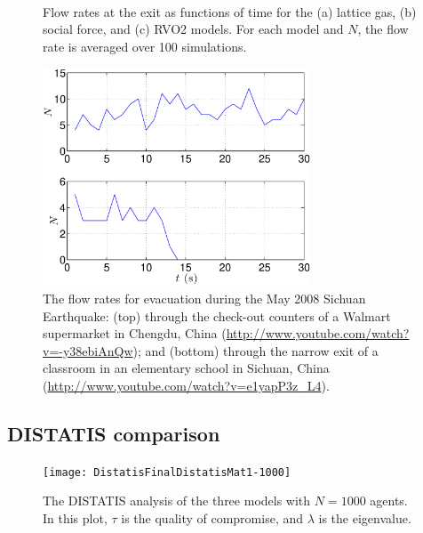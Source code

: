 \begin{figure}[htbp]
\centering
{}
\hspace{1cm}
\\
\caption{Flow rates at the exit as functions of time for the (a) lattice gas, (b) social force, and (c) RVO2 models. For each model and $N$, the flow rate is averaged over 100 simulations.}
\label{fig:FlowRate}
\end{figure}

\begin{figure}[htbp]
\centering
\includegraphics[width=8cm]{figures/Flowrate}
\caption{The flow rates for evacuation during the May 2008 Sichuan Earthquake: (top) through the check-out counters of a Walmart supermarket in Chengdu, China (\url{http://www.youtube.com/watch?v=-y38ebiAnQw}); and (bottom) through the narrow exit of a classroom in an elementary school in Sichuan, China (\url{http://www.youtube.com/watch?v=e1yapP3z_L4}).}
\centering
\label{fig:RealData}
\end{figure}


\subsection{DISTATIS comparison}

\begin{figure}[htbp]
\centering
\texttt{[image: DistatisFinalDistatisMat1-1000]}
\caption{The DISTATIS analysis of the three models with $N = 1000$ agents. In this plot, $\tau$ is the quality of compromise, and $\lambda$ is the eigenvalue.}
\label{fig:Distatis1000}
\end{figure}

